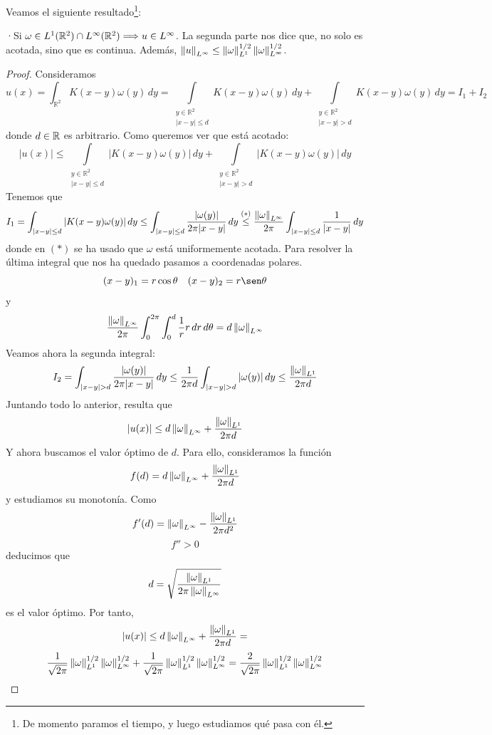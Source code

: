 Veamos el siguiente resultado\footnote{De momento paramos el tiempo, y luego estudiamos qué pasa con él.}:

\begin{lema}
    ·Si $\omega \in L^1(\mathbb{R}^2) \cap L^\infty(\mathbb{R}^2) \Longrightarrow u \in L^\infty$. La segunda parte nos dice que, no solo es acotada, sino que es continua.
    Además, $\left\lVert u \right\rVert_{L^\infty} \leq \left\lVert \omega \right\rVert_{L^1}^{1/2} \left\lVert \omega \right\rVert_{L^\infty}^{1/2}$.
\end{lema}

\begin{proof}
    Consideramos 
    $$u(x) = \int_{\mathbb{R}^2} K(x-y)\omega(y)\,dy =
    \int\limits_{\substack{y\in\mathbb{R}^2\\|x-y|\leq d }} K(x-y)\omega(y)\,dy +
    \int\limits_{\substack{y\in\mathbb{R}^2\\|x-y| > d }} K(x-y)\omega(y)\,dy = I_1 + I_2$$
    donde $d \in \mathbb{R}$ es arbitrario. Como queremos ver que está acotado:
    $$|u(x)| \leq
    \int\limits_{\substack{y\in\mathbb{R}^2\\|x-y|\leq d}} |K(x-y)\omega(y)|\,dy + 
    \int\limits_{\substack{y\in\mathbb{R}^2\\|x-y| > d}} |K(x-y)\omega(y)|\,dy$$
    Tenemos que 
    $$I_1 = \int_{|x-y| \leq d} |K(x-y) \omega(y)|\,dy \leq \int_{|x-y| \leq d} \dfrac{|\omega(y)|}{2 \pi |x-y|}\,dy \stackrel{(*)}{\leq} 
    \dfrac{\left\lVert \omega \right\rVert_{L^\infty}}{2 \pi} \int_{|x-y| \leq d} \dfrac{1}{|x-y|}\,dy$$
    donde en $(*)$ se ha usado que $\omega$ está uniformemente acotada. Para resolver la última integral que nos ha quedado pasamos a coordenadas polares.
    $$(x-y)_1 = r \cos \theta \quad (x-y)_2 = r \sen \theta$$
    y
    $$\dfrac{\left\lVert \omega \right\rVert_{L^\infty}}{2 \pi} \int_{0}^{2 \pi} \int_{0}^{d} \dfrac{1}{r} r \,dr\,d \theta = d \left\lVert \omega \right\rVert_{L^\infty}$$
    Veamos ahora la segunda integral:
    $$I_2 = \int_{|x-y| > d} \dfrac{|\omega(y)|}{2 \pi |x-y|}\,dy \leq \dfrac{1}{2 \pi d} \int_{|x-y| > d} |\omega(y)|\,dy \leq 
    \dfrac{\left\lVert \omega \right\rVert_{L^1}}{2 \pi d}$$
    Juntando todo lo anterior, resulta que
    $$|u(x)| \leq d \left\lVert \omega \right\rVert_{L^\infty} + \dfrac{\left\lVert \omega \right\rVert_{L^1}}{2 \pi d}$$
    Y ahora buscamos el valor óptimo de $d$. Para ello, consideramos la función
    $$f(d) = d \left\lVert \omega \right\rVert_{L^\infty} + \dfrac{\left\lVert \omega \right\rVert_{L^1}}{2 \pi d}$$
    y estudiamos su monotonía. Como
    $$f'(d) = \left\lVert \omega \right\rVert_{L^\infty} - \dfrac{\left\lVert \omega \right\rVert_{L^1}}{2 \pi d^2}$$
    $$f'' > 0$$
    deducimos que 
    $$d = \sqrt{\dfrac{\left\lVert \omega \right\rVert_{L^1}}{2 \pi \left\lVert \omega \right\rVert_{L^\infty}}}$$
    es el valor óptimo. Por tanto,
    $$|u(x)| \leq d \left\lVert \omega \right\rVert_{L^\infty} + \dfrac{\left\lVert \omega \right\rVert_{L^1}}{2 \pi d} = $$
    $$\dfrac{1}{\sqrt{2 \pi}} \left\lVert \omega \right\rVert_{L^1}^{1/2} \left\lVert \omega \right\rVert_{L^\infty}^{1/2} + 
    \dfrac{1}{\sqrt{2 \pi}} \left\lVert \omega \right\rVert_{L^1}^{1/2} \left\lVert \omega \right\rVert_{L^\infty}^{1/2} = \dfrac{2}{\sqrt{2 \pi}} \left\lVert \omega \right\rVert_{L^1}^{1/2} \left\lVert \omega \right\rVert_{L^\infty}^{1/2} $$ 
\end{proof}

